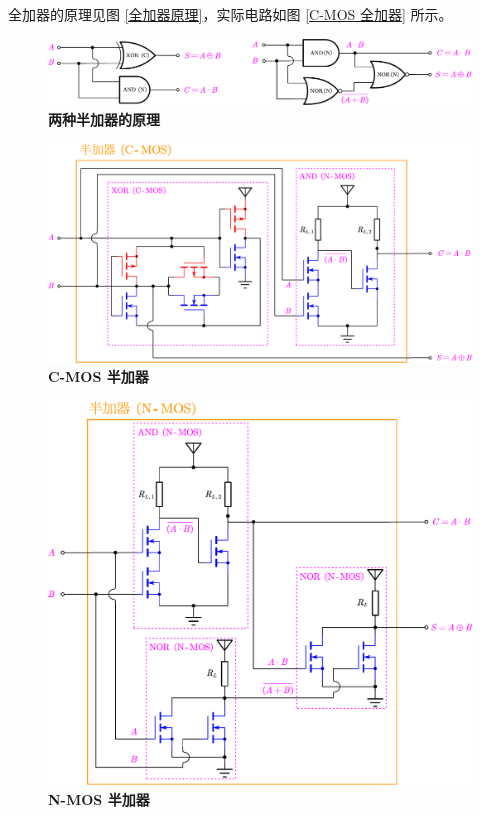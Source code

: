 \documentclass[UTF8]{report}
\theoremstyle{MyLineTheoremStyle} %
\theoremstyle{MyBlockTheoremStyle} %
\theoremstyle{MySubsubsectionStyle} %
\begin{document}
全加器的原理见图 \ref{全加器原理}，实际电路如图 \ref{C-MOS 全加器} 所示。

\newpage
\begin{figure}[H]\centering
\includegraphics[width=0.85\columnwidth]{assets/2/半加器原理.pdf}
\caption{\bfseries 两种半加器的原理}\label{两种半加器的原理}
\end{figure}

\begin{figure}[H]\centering
\includegraphics[width=0.85\columnwidth]{assets/2/CMOS 半加器.pdf}
\caption{\bfseries C-MOS 半加器}\label{C-MOS 半加器}
\end{figure}

\begin{figure}[H]\centering
\includegraphics[width=0.75\columnwidth]{assets/2/NMOS 半加器.pdf}
\caption{\bfseries N-MOS 半加器}\label{N-MOS 半加器}
\end{figure}
\end{document}
